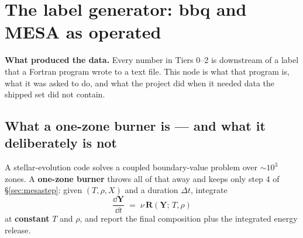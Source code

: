 %
%
%

\section{The label generator: bbq and MESA as operated}
\label{part:generator}

\textbf{What produced the data.} Every number in Tiers 0--2 is downstream of a
label that a Fortran program wrote to a text file. This node is what that
program is, what it was asked to do, and what the project did when it needed
data the shipped set did not contain.

\subsection{What a one-zone burner is --- and what it deliberately is not}
\label{sec:onezone}

A stellar-evolution code solves a coupled boundary-value problem over
${\sim}10^{3}$ zones. A \textbf{one-zone burner} throws all of that away and
keeps only step 4 of \S\ref{sec:mesastep}: given $(T, \rho, X)$ and a duration
$\Delta t$, integrate
%
\begin{equation}
\label{eq:onezone}
\frac{\dd\mathbf{Y}}{\dd t} \;=\; \nu\,\mathbf{R}(\mathbf{Y};\,T,\rho)
\end{equation}
%
at \textbf{constant} $T$ and $\rho$, and report the final composition plus the
integrated energy release.

